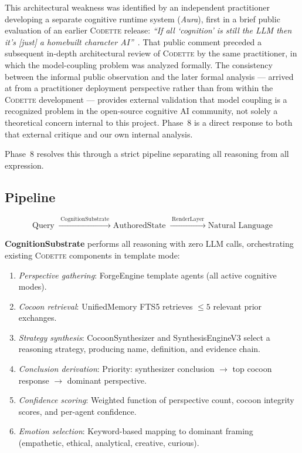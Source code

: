 \documentclass[11pt,a4paper]{article}
\newcommand{\codette}{\textsc{Codette}}
\begin{document}
This architectural weakness was identified by an independent practitioner
developing a separate cognitive runtime system (\emph{Aura}), first in a
brief public evaluation of an earlier \codette{} release: \emph{``If all
`cognition' is still the LLM then it's [just] a homebuilt character
AI''}~\citep{auracf2025reddit}. That public comment preceded a subsequent
in-depth architectural review of \codette{} by the same practitioner, in
which the model-coupling problem was analyzed formally. The consistency
between the informal public observation and the later formal analysis ---
arrived at from a practitioner deployment perspective rather than from
within the \codette{} development --- provides external validation that
model coupling is a recognized problem in the open-source cognitive AI
community, not solely a theoretical concern internal to this project.
Phase~8 is a direct response to both that external critique and our own
internal analysis.

Phase~8 resolves this through a strict pipeline separating all reasoning from
all expression.

\subsection{Pipeline}

\begin{equation}
\text{Query}
\;\xrightarrow{\;\text{CognitionSubstrate}\;}
\text{AuthoredState}
\;\xrightarrow{\;\text{RenderLayer}\;}
\text{Natural Language}
\end{equation}

\textbf{CognitionSubstrate} performs all reasoning with zero LLM calls,
orchestrating existing \codette{} components in template mode:

\begin{enumerate}[nosep]
  \item \emph{Perspective gathering}: ForgeEngine template agents (all
    active cognitive modes).
  \item \emph{Cocoon retrieval}: UnifiedMemory FTS5 retrieves $\leq 5$
    relevant prior exchanges.
  \item \emph{Strategy synthesis}: CocoonSynthesizer and SynthesisEngineV3
    select a reasoning strategy, producing name, definition, and evidence
    chain.
  \item \emph{Conclusion derivation}: Priority: synthesizer conclusion $\to$
    top cocoon response $\to$ dominant perspective.
  \item \emph{Confidence scoring}: Weighted function of perspective count,
    cocoon integrity scores, and per-agent confidence.
  \item \emph{Emotion selection}: Keyword-based mapping to dominant framing
    (empathetic, ethical, analytical, creative, curious).
\end{enumerate}
\end{document}
